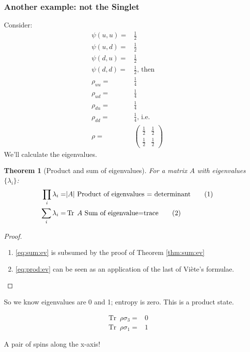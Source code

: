 \documentclass[]{article}
\newcommand\numberthis{\addtocounter{equation}{1}\tag{\theequation}}
\newtheorem{thm}{Theorem}
\DeclareMathOperator{\Tr}{Tr \;}
\begin{document}
\subsubsection{Another example: not the Singlet}
Consider:
\begin{align*}
	\psi(u,u) =& \frac{1}{2}\\
	\psi(u,d) =& \frac{1}{2}\\
	\psi(d,u) =& \frac{1}{2}\\
	\psi(d,d) =& \frac{1}{2} \text{, then}\\
	\rho_{uu} =& \frac{1}{4} \\
	\rho_{ud} =& \frac{1}{4}\\
	\rho_{du} =&  \frac{1}{4}\\
	\rho_{dd} =&  \frac{1}{4} \text{, i.e.}\\
	\rho =& \begin{pmatrix}
		\frac{1} {2}&\frac{1} {2}\\
		\frac{1} {2} &\frac{1}{2}
	\end{pmatrix}	
\end{align*}
We'll calculate the eigenvalues.
\begin{thm}[Product and sum of eigenvalues]
	For a matrix $A$ with eigenvalues  $\{\lambda_i\}$:
	\begin{align*}
		\prod_i \lambda_i =& \vert A \vert \text{ Product of eigenvalues = determinant} \numberthis \label{eq:prod:ev}\\
		\sum_i \lambda_i =& \Tr A \text{ Sum of eigenvalue=trace} \numberthis \label{eq:sum:ev}
	\end{align*}
\end{thm}
\begin{proof}
	\begin{enumerate}
		\item \eqref{eq:sum:ev} is subsumed by the proof of Theorem \ref{thm:sum:ev}
		\item \eqref{eq:prod:ev} can be seen as an application of the last of Vi\`ete's  formulae\cite{enwiki:1030161470}.
	\end{enumerate}
\end{proof}
So we know eigenvalues are 0 and 1; entropy is zero. This is a product state.

\begin{align*}
	\Tr \rho \sigma_3 =& 0\\
	\Tr \rho \sigma_1 =& 1
\end{align*}

A pair of spins along the x-axis!
\end{document}
